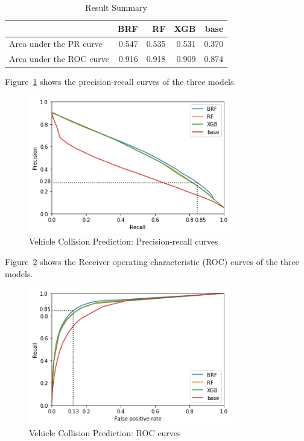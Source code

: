 \documentclass[conference]{IEEEtran}
\begin{document}
\begin{table}[htbp]
\caption{Result Summary}
\begin{center}
\begin{tabular}{|l|r|r|r|r|}
\cline{2-5}
\multicolumn{1}{c|}{}    &    BRF &    RF  &    XGB & base \\
\hline
Area under the PR curve  &  0.547 &  0.535 &  0.531 & 0.370 \\
Area under the ROC curve &  0.916 &  0.918 &  0.909 & 0.874 \\
\hline
\end{tabular}
\label{table:summary}
\end{center}
\end{table}

Figure~\ref{fig:precision-recall} shows the precision-recall curves of the three models.

\begin{figure}[htbp]
\centerline{\includegraphics[height=6cm, keepaspectratio]{Figures/pr.png}}
\caption{Vehicle Collision Prediction: Precision-recall curves}
\label{fig:precision-recall}
\end{figure}

Figure~\ref{fig:roc} shows the Receiver operating characteristic (ROC) curves of the three models.

\begin{figure}[htbp]
\centerline{\includegraphics[height=6cm, keepaspectratio]{Figures/roc.png}}
\caption{Vehicle Collision Prediction: ROC curves}
\label{fig:roc}
\end{figure}
\end{document}
